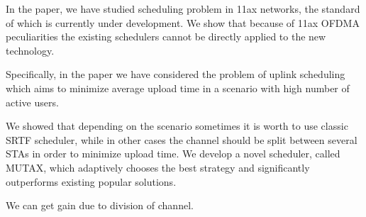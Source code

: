In the paper, we have studied scheduling problem in 11ax networks, the standard of which is currently under development.
We show that because of 11ax OFDMA peculiarities the existing schedulers cannot be directly applied to the new technology.

Specifically, in the paper we have considered the problem of uplink scheduling which aims to minimize average upload time in a scenario with high number of active users.

We showed that depending on the scenario sometimes it is worth to use classic SRTF scheduler, while in other cases the channel should be split between several STAs in order to minimize upload time.
We develop a novel scheduler, called MUTAX, which adaptively chooses the best strategy and significantly outperforms existing popular solutions.

We can get gain due to division of channel. 

\clearpage

